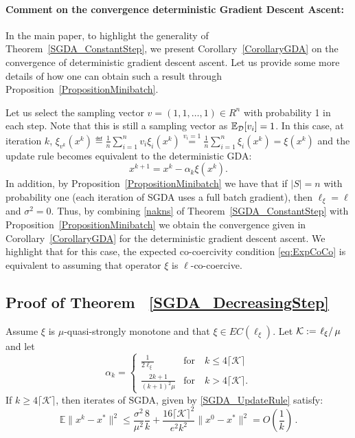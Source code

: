 \documentclass{article}
\begin{document}
\paragraph{Comment on the convergence deterministic Gradient Descent Ascent:} In the main paper, to highlight the generality of Theorem~\ref{SGDA_ConstantStep},  we present Corollary~\ref{CorollaryGDA} on the convergence of deterministic gradient descent ascent. Let us provide some more details of how one can obtain such a result through Proposition~\ref{PropositionMinibatch}.

Let us select the sampling vector $v = (1,1, \dots, 1) \in R^n$ with probability 1 in each step. Note that this is still a sampling vector as $\mathbb{E}_{{\cal D}}[v_i]=1$. In this case, at iteration $k$, $\xi_{v^k}(x^k) \eqdef \frac{1}{n} \sum _{i=1}^n v_i \xi_i(x^k)\overset{v_i=1}{=} \frac{1}{n} \sum _{i=1}^n \xi_i(x^k)=\xi(x^k)$ and the update rule becomes equivalent to the deterministic GDA: $$x^{k+1}=x^k -\alpha_k \xi (x^k).$$ In addition, by Proposition~\ref{PropositionMinibatch} we have that if $|S|=n$ with probability one (each iteration of SGDA uses a full batch gradient), then $\ell_\xi=\ell$ and $\sigma^2=0$.
Thus, by combining \eqref{nakns} of Theorem~\ref{SGDA_ConstantStep} with Proposition~\ref{PropositionMinibatch} we obtain the convergence given in Corollary~\ref{CorollaryGDA} for the deterministic gradient descent ascent. 
We highlight that for this case, the expected co-coercivity condition \eqref{eq:ExpCoCo} is equivalent to assuming that operator $\xi$ is $\ell$-co-coercive.
\subsection{Proof of Theorem ~\ref{SGDA_DecreasingStep}}
\label{ProofSGDA_DecreasingStep}
\begin{theorem}
\label{Appendix_SGDA_DecreasingStep}
Assume $\xi$ is $\mu$-quasi-strongly monotone and that $\xi \in EC( \ell_{\xi})$. Let  $\mathcal{K} := \left.\ell_\xi\right/\mu$ and let 
\begin{equation}
\alpha_k= 
\begin{cases}
\displaystyle \frac{1}{2 \ell_\xi} & \mbox{for}\quad k \leq 4\lceil\mathcal{K} \rceil \\[0.3cm]
\displaystyle \frac{2k+1}{(k+1)^2 \mu} &  \mbox{for}\quad k > 4\lceil\mathcal{K} \rceil.
\end{cases}
\end{equation}
 If $k \geq 4 \lceil\mathcal{K} \rceil$, then iterates of SGDA, given by \eqref{SGDA_UpdateRule} satisfy:
\begin{equation}
\mathbb{E}\| x^{k} - x^*\|^2 \le   \frac{\sigma^2 }{\mu^2 }\frac{8 }{k} + \frac{16 \lceil\mathcal{K} \rceil^2}{e^2 k^2 }  \|x^0 - x^*\|^2 = O\left(\frac{1}{k}\right) \, .
\end{equation}
\end{theorem}
\end{document}
